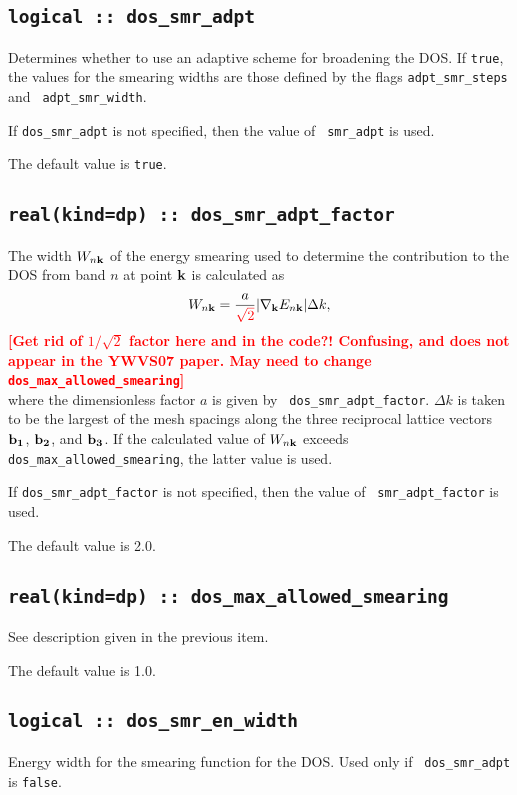 \subsection[dos\_smr\_adaptive]{\tt logical :: dos\_smr\_adpt}
Determines whether to use an adaptive scheme for broadening the
DOS. If \verb#true#, the values for the smearing widths are those
defined by the flags {\tt adpt\_smr\_steps} and {\tt
  adpt\_smr\_width}.

If {\tt dos\_smr\_adpt} is not specified, then the value of {\tt
  smr\_adpt} is used.  

The default value is \verb#true#.


\subsection[dos\_smr\_adaptive]{\tt real(kind=dp) :: dos\_smr\_adpt\_factor}

The width $W_{n{\bf k}}$ of the energy smearing used to determine the
contribution to the DOS from band $n$ at point ${\bf k}$ is calculated
as
%
$$
W_{n{\bf k}}=\frac{a}{\textcolor{red}{\sqrt{2}}}\vert
\nabla_{\bf k} E_{n{\bf k}}\vert \Delta k,
$$ 
%
\textcolor{red}{{\bf [Get rid of $1/\sqrt{2}$ factor here and in the code?! 
Confusing, and does not appear in the YWVS07 paper. May need to change
{\tt dos\_max\_allowed\_smearing}]}}\\
where the dimensionless factor $a$ is given by {\tt
  dos\_smr\_adpt\_factor}. $\Delta k$ is taken to be the largest of
the mesh spacings along the three reciprocal lattice vectors ${\bf
  b_1}$, ${\bf b_2}$, and ${\bf b_3}$.  If the calculated value of
$W_{n{\bf k}}$ exceeds {\tt dos\_max\_allowed\_smearing}, the latter
value is used.

If {\tt dos\_smr\_adpt\_factor} is not specified, then the value of {\tt
  smr\_adpt\_factor} is used.  

The default value is 2.0.


\subsection[dos\_smr\_adaptive]{\tt real(kind=dp) :: dos\_max\_allowed\_smearing}

See description given in the previous item.

The default value is 1.0.

\subsection[dos\_smr\_en\_width]{\tt logical :: dos\_smr\_en\_width}
Energy width for the smearing function for the DOS. Used only if {\tt
  dos\_smr\_adpt} is \verb#false#.

